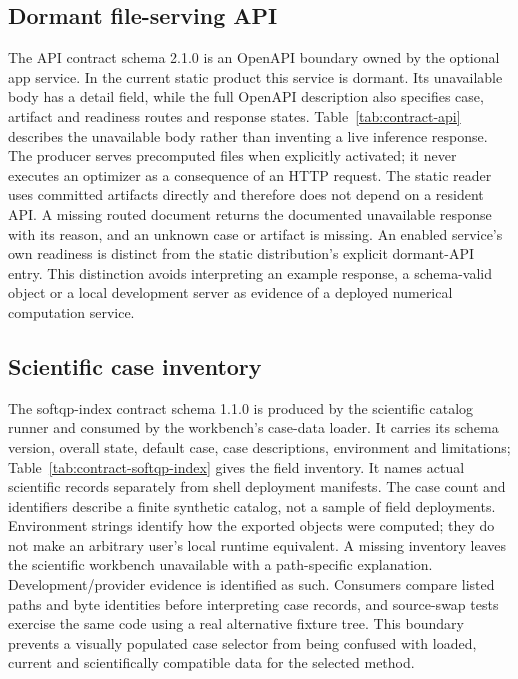 \subsection{Dormant file-serving API}\label{sec:contract-api}
The API contract schema 2.1.0 is an OpenAPI boundary owned by the optional app
service. In the current static product this service is dormant. Its unavailable
body has a detail field, while the full OpenAPI description also specifies
case, artifact and readiness routes and response states. Table~\ref{tab:contract-api}
describes the unavailable body rather than inventing a live inference response.
The producer serves precomputed files when explicitly activated; it never
executes an optimizer as a consequence of an HTTP request. The static reader
uses committed artifacts directly and therefore does not depend on a resident
API. A missing routed document returns the documented unavailable response
with its reason, and an unknown case or artifact is missing. An enabled
service's own readiness is distinct from the static distribution's explicit
dormant-API entry. This distinction avoids interpreting an example response,
a schema-valid object or a local development server as evidence of a deployed
numerical computation service.


\subsection{Scientific case inventory}\label{sec:contract-softqp-index}
The softqp-index contract schema 1.1.0 is produced by the scientific catalog
runner and consumed by the workbench's case-data loader. It carries its schema
version, overall state, default case, case descriptions, environment and
limitations; Table~\ref{tab:contract-softqp-index} gives the field inventory.
It names actual scientific records separately from shell deployment manifests.
The case count and identifiers describe a finite synthetic catalog, not a
sample of field deployments. Environment strings identify how the exported
objects were computed; they do not make an arbitrary user's local runtime
equivalent. A missing inventory leaves the scientific workbench unavailable
with a path-specific explanation. Development/provider evidence is identified
as such. Consumers compare listed paths and byte identities before interpreting
case records, and source-swap tests exercise the same code using a real
alternative fixture tree. This boundary prevents a visually populated case
selector from being confused with loaded, current and scientifically compatible
data for the selected method.


